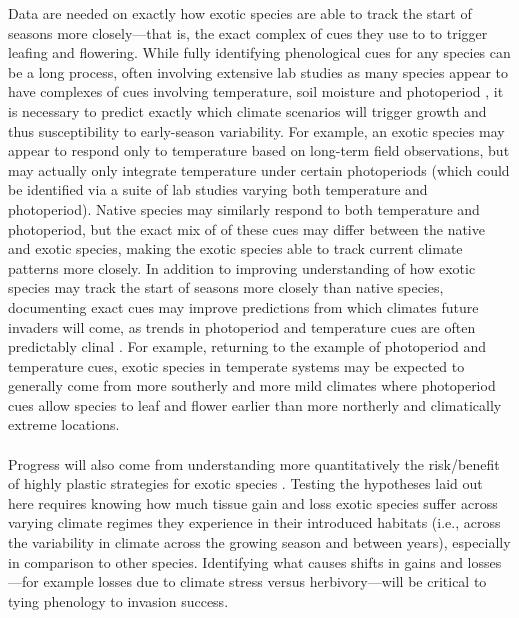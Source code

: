 \documentclass[11pt,a4paper,oneside]{article}
\begin{document}
Data are needed on exactly how exotic species are able to track the start of seasons more closely---that is, the exact complex of cues they use to to trigger leafing and flowering. While fully identifying phenological cues for any species can be a long process, often involving extensive lab studies as many species appear to have complexes of cues involving temperature, soil moisture and photoperiod \citep{Stinchcombe:2004ec,Wilczek:2010ad}, it is necessary to predict exactly which climate scenarios will trigger growth and thus susceptibility to early-season variability. For example, an exotic species may appear to respond only to temperature based on long-term field observations, but may actually only integrate temperature under certain photoperiods (which could be identified via a suite of lab studies varying both temperature and photoperiod). Native species may similarly respond to both temperature and photoperiod, but the exact mix of of these cues may differ between the native and exotic species, making the exotic species able to track current climate patterns more closely. In addition to improving understanding of how exotic species may track the start of seasons more closely than native species, documenting exact cues may improve predictions from which climates future invaders will come, as trends in photoperiod and temperature cues are often predictably clinal \citep{Howe:2003,Wilczek:2009oa}. For example, returning to the example of photoperiod and temperature cues, exotic species in temperate systems may be expected to generally come from more southerly and more mild climates where photoperiod cues allow species to leaf and flower earlier than more northerly and climatically extreme locations.\\
\\ 
Progress will also come from understanding more quantitatively the risk/benefit of highly plastic strategies for exotic species \citep[e.g., exotic species that senesce later in the fall often lose green leaves to the first frost, which should be a major carbon and nutrient loss, see][]{Fridley:2012fj}. Testing the hypotheses laid out here requires knowing how much tissue gain and loss exotic species suffer across varying climate regimes they experience in their introduced habitats (i.e., across the variability in climate across the growing season and between years), especially in comparison to other species. Identifying what causes shifts in gains and losses---for example losses due to climate stress versus herbivory---will be critical to tying phenology to invasion success. \\
\end{document}
